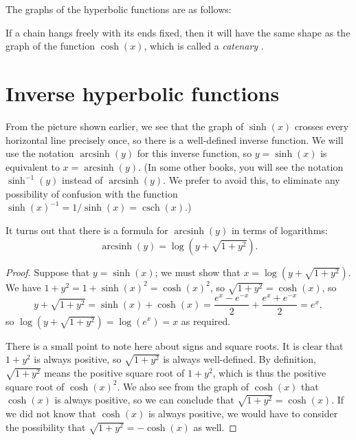 \documentclass[a4paper]{book}
\newcommand{\PURPLE}[1]{{\color{purple}#1}}
\newcommand{\csch}     {\operatorname{csch}}
\newcommand{\arcsinh}  {\operatorname{arcsinh}}
\renewcommand{\:}{\colon}
\newcommand{\mathworld}[1]{}
\newcommand{\DEFN}[1]{\PURPLE{\emph{#1}}}
\theoremstyle{definition}
\begin{document}
The graphs of the hyperbolic functions are as follows:
\begin{center}
\end{center}
If a chain hangs freely with its ends fixed, then it will have the
same shape as the graph of the function $\cosh(x)$, which is called a
\DEFN{catenary} \mathworld{Catenary}.

\section{Inverse hyperbolic functions}
\label{sec-archyp}

From the picture shown earlier, we see that the graph of $\sinh(x)$
crosses every horizontal line precisely once, so there is a
well-defined inverse function.  We will use the notation $\arcsinh(y)$
for this inverse function, so $y=\sinh(x)$ is equivalent to
$x=\arcsinh(y)$.  (In some other books, you will see the notation
$\sinh^{-1}(y)$ instead of $\arcsinh(y)$.  We prefer to avoid this, to
eliminate any possibility of confusion with the function
$\sinh(x)^{-1}=1/\sinh(x)=\csch(x)$.)

It turns out that there is a formula for $\arcsinh(y)$ in terms of
logarithms:
\[ \arcsinh(y) = \log(y + \sqrt{1+y^2}). \]
\begin{proof}
 Suppose that $y=\sinh(x)$; we must show that
 $x=\log(y+\sqrt{1+y^2})$.  We have $1+y^2=1+\sinh(x)^2=\cosh(x)^2$,
 so $\sqrt{1+y^2}=\cosh(x)$, so
 \[ y + \sqrt{1+y^2} = \sinh(x) + \cosh(x) =
     \frac{e^x-e^{-x}}{2} + \frac{e^x+e^{-x}}{2} = e^x,
 \]
 so $\log(y+\sqrt{1+y^2})=\log(e^x)=x$ as required.

 There is a small point to note here about signs and square roots.  It
 is clear that $1+y^2$ is always positive, so $\sqrt{1+y^2}$ is always
 well-defined.  By definition, $\sqrt{1+y^2}$ means the positive
 square root of $1+y^2$, which is thus the positive square root of
 $\cosh(x)^2$.  We also see from the graph of $\cosh(x)$ that
 $\cosh(x)$ is always positive, so we can conclude that
 $\sqrt{1+y^2}=\cosh(x)$.  If we did not know that $\cosh(x)$ is
 always positive, we would have to consider the possibility that
 $\sqrt{1+y^2}=-\cosh(x)$ as well.
\end{proof}
\end{document}
